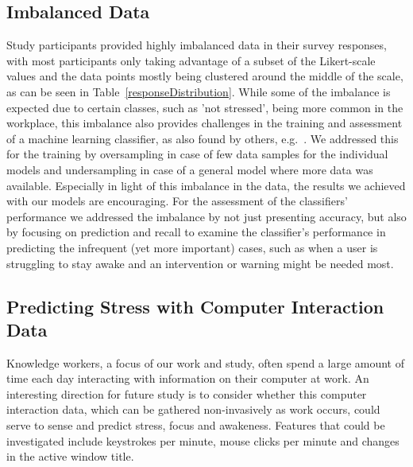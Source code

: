 \subsection{Imbalanced Data}
Study participants provided highly
imbalanced data in their survey responses, with most participants only
taking advantage of a subset of the Likert-scale values and the data
points mostly being clustered around the middle of the scale, as can
be seen in Table~\ref{responseDistribution}. While some of the
imbalance is expected due to certain classes, such as 'not stressed',
being more common in the workplace, this imbalance also provides
challenges in the training and assessment of a machine learning
classifier, as also found by others, e.g.~\cite{Exler16}. We addressed
this for the training by oversampling in case of few data samples for
the individual models and undersampling in case of a general model
where more data was available. Especially in light of this imbalance
in the data, the results we achieved with our models are
encouraging. For the assessment of the classifiers' performance we
addressed the imbalance by not just presenting accuracy, but also by
focusing on prediction and recall to examine the classifier's
performance in predicting the infrequent (yet more important) cases,
such as when a user is struggling to stay awake and an intervention or
warning might be needed most.

\subsection{Predicting Stress with Computer Interaction Data}
Knowledge workers, a focus of our work and study, often spend
a large amount of time each day interacting with information on 
their computer at work. An interesting direction for future study
is to consider whether this computer interaction data, which can
be gathered non-invasively as work occurs, could serve to sense
and predict stress, focus and awakeness. Features that could be
investigated include keystrokes per minute, mouse clicks per minute
and changes in the active window title.




